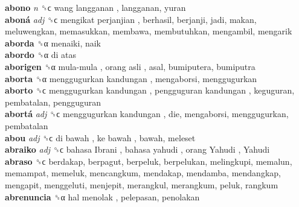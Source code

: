 \textbf{abono} \emph{n}  ␝ϲ   wang langganan , langganan, yuran  \\
\textbf{aboná} \emph{adj}  ␝ϲ   mengikat perjanjian , berhasil, berjanji, jadi, makan, meluwengkan, memasukkan, membawa, membutuhkan, mengambil, mengarik  \\
\textbf{aborda} ␝α  menaiki, naik  \\
\textbf{abordo} ␝α   di atas   \\
\textbf{aborigen} ␝α   mula-mula ,  orang asli , asal, bumiputera, bumiputra  \\
\textbf{aborta} ␝α   menggugurkan kandungan , mengaborsi, menggugurkan  \\
\textbf{aborto} ␝ϲ   menggugurkan kandungan ,  pengguguran kandungan , keguguran, pembatalan, pengguguran  \\
\textbf{abortá} \emph{adj}  ␝ϲ   menggugurkan kandungan , die, mengaborsi, menggugurkan, pembatalan  \\
\textbf{abou} \emph{adj}  ␝ϲ   di bawah ,  ke bawah , bawah, meleset  \\
\textbf{abraiko} \emph{adj}  ␝ϲ   bahasa Ibrani ,  bahasa yahudi ,  orang Yahudi ,  Yahudi   \\
\textbf{abraso} ␝ϲ  berdakap, berpagut, berpeluk, berpelukan, melingkupi, memalun, memampat, memeluk, mencangkum, mendakap, mendamba, mendangkap, mengapit, menggeluti, menjepit, merangkul, merangkum, peluk, rangkum  \\
\textbf{abrenuncia} ␝α   hal menolak , pelepasan, penolakan  \\
